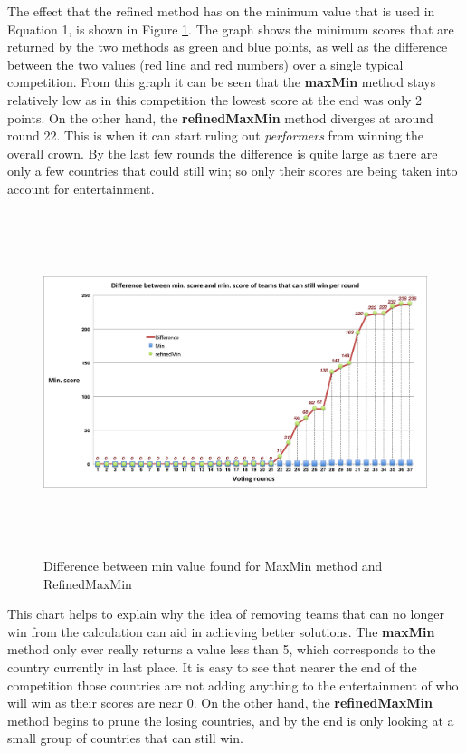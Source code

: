 \documentclass[12pt]{report}
\begin{document}
The effect that the refined method has on the minimum value that is used in Equation 1, is shown in Figure \ref{f_maxminDif}. The graph shows the minimum scores that are returned by the two methods as green and blue points, as well as the difference between the two values (red line and red numbers) over a single typical competition. From this graph it can be seen that the \textbf{maxMin} method stays relatively low as in this competition the lowest score at the end was only 2 points. On the other hand, the \textbf{refinedMaxMin} method diverges at around round 22. This is when it can start ruling out \textit{performers} from winning the overall crown. By the last few rounds the difference is quite large as there are only a few countries that could still win; so only their scores are being taken into account for entertainment.

\begin{figure}[H]
\centering
\includegraphics[width=18cm, height=10cm]{../code/misc/difference_MinvsRefinedMin}
\caption{Difference between min value found for MaxMin method and RefinedMaxMin}
\label{f_maxminDif}
\end{figure}

This chart helps to explain why the idea of removing teams that can no longer win from the calculation can aid in achieving better solutions. The \textbf{maxMin} method only ever really returns a value less than 5, which corresponds to the country currently in last place. It is easy to see that nearer the end of the competition those countries are not adding anything to the entertainment of who will win as their scores are near 0. On the other hand, the \textbf{refinedMaxMin} method begins to prune the losing countries, and by the end is only looking at a small group of countries that can still win.
\end{document}
